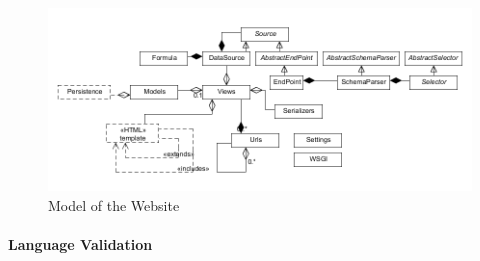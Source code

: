 \begin{figure}
\begin{center}
\includegraphics[width=\linewidth]{images/websitemodel}
\end{center}
\caption{Model of the Website}
\label{fig:websitemodel}
\end{figure}

\paragraph{Language Validation}

